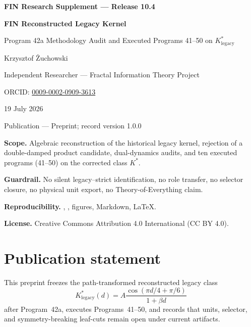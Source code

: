 \documentclass[11pt,a4paper,openany]{report}
\begin{document}
\hypersetup{pageanchor=false}
\begin{titlepage}
\centering
\vspace*{10mm}
{\Large\bfseries FIN Research Supplement --- Release 10.4\par}
\vspace{11mm}
{\Huge\bfseries FIN Reconstructed Legacy Kernel\par}
\vspace{6mm}
{\Large Program 42a Methodology Audit and Executed Programs 41--50 on \(K^*_{\mathrm{legacy}}\)\par}
\vspace{17mm}
{\Large Krzysztof \.Zuchowski\par}
\vspace{2mm}
{\normalsize Independent Researcher --- Fractal Information Theory Project\par}
\vspace{2mm}
{\normalsize ORCID: \href{https://orcid.org/0009-0002-0909-3613}{0009-0002-0909-3613}\par}
\vspace{10mm}
{\large 19 July 2026\par}
{\normalsize Publication --- Preprint; record version 1.0.0\par}
\vfill
\begin{minipage}{0.88\textwidth}
\small
\textbf{Scope.} Algebraic reconstruction of the historical legacy kernel, rejection of a double-damped product candidate, dual-dynamics audits, and ten executed programs (41--50) on the corrected class \(K^*\).

\medskip
\textbf{Guardrail.} No silent legacy--strict identification, no role transfer, no selector closure, no physical unit export, no Theory-of-Everything claim.

\medskip
\textbf{Reproducibility.} , , figures, Markdown, LaTeX.

\medskip
\textbf{License.} Creative Commons Attribution 4.0 International (CC BY 4.0).
\end{minipage}
\vfill
\end{titlepage}
\hypersetup{pageanchor=true}

\chapter*{Publication statement}
This preprint freezes the path-transformed reconstructed legacy class
\[
K^*_{\mathrm{legacy}}(d)=A\frac{\cos(\pi d/4+\pi/6)}{1+\beta d}
\]
after Program~42a, executes Programs~41--50, and records that units, selector, and symmetry-breaking leaf-cuts remain open under current artifacts.
\end{document}
